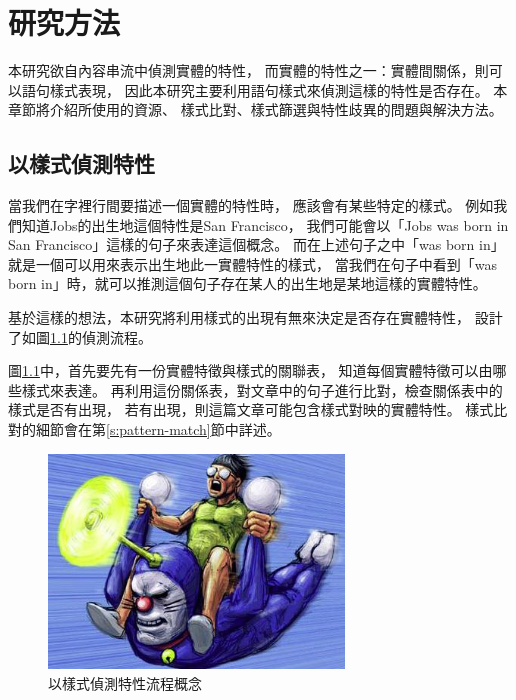 %
%
%
\chapter{研究方法}
\label{c:method}

本研究欲自內容串流中偵測實體的特性，
而實體的特性之一：實體間關係，則可以語句樣式表現，
因此本研究主要利用語句樣式來偵測這樣的特性是否存在。
本章節將介紹所使用的資源、
樣式比對、樣式篩選與特性歧異的問題與解決方法。

\section{以樣式偵測特性}
當我們在字裡行間要描述一個實體的特性時，
應該會有某些特定的樣式。
例如我們知道Jobs的出生地這個特性是San Francisco，
我們可能會以「Jobs was born in San Francisco」這樣的句子來表達這個概念。
而在上述句子之中「was born in」就是一個可以用來表示出生地此一實體特性的樣式，
當我們在句子中看到「was born in」時，就可以推測這個句子存在某人的出生地是某地這樣的實體特性。

基於這樣的想法，本研究將利用樣式的出現有無來決定是否存在實體特性，
設計了如圖\ref{i:process-v1}的偵測流程。

圖\ref{i:process-v1}中，首先要先有一份實體特徵與樣式的關聯表，
知道每個實體特徵可以由哪些樣式來表達。
再利用這份關係表，對文章中的句子進行比對，檢查關係表中的樣式是否有出現，
若有出現，則這篇文章可能包含樣式對映的實體特性。
樣式比對的細節會在第\ref{s:pattern-match}節中詳述。

\begin{figure}
    \centering
    \includegraphics[width=0.7\textwidth]{images/00-tmp-img}    %
    \caption{以樣式偵測特性流程概念}
    \label{i:process-v1}
\end{figure}

